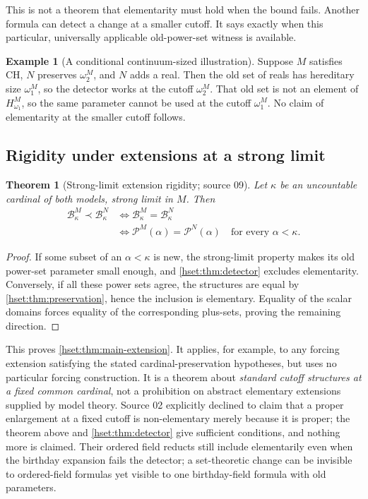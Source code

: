 \documentclass[11pt,letterpaper]{article}
\newtheorem{theorem}{Theorem}[section]
\theoremstyle{definition}
\newtheorem{example}[example]{Example}\aliascntresetthe{example}
\theoremstyle{remark}
\newcommand{\B}{\mathcal B}
\newcommand{\Pow}{\mathcal P}
\begin{document}
This is not a theorem that elementarity must hold when the bound fails.
Another formula can detect a change at a smaller cutoff. It says exactly
when this particular, universally applicable old-power-set witness is
available.

\begin{example}[A conditional continuum-sized illustration]
Suppose $M$ satisfies CH, $N$ preserves $\omega_2^M$, and $N$ adds a real.
Then the old set of reals has hereditary size $\omega_1^M$, so the detector
works at the cutoff $\omega_2^M$. That old set is not an element of
$H_{\omega_1}^M$, so the same parameter cannot be used at the cutoff
$\omega_1^M$. No claim of elementarity at the smaller cutoff follows.
\end{example}

\subsection{Rigidity under extensions at a strong limit}

\begin{theorem}[Strong-limit extension rigidity; source 09]
\label{hset:thm:extension-rigidity}
Let $\kappa$ be an uncountable cardinal of both models, strong limit in $M$.
Then
\begin{align*}
 \B_\kappa^M\prec\B_\kappa^N
 &\iff \B_\kappa^M=\B_\kappa^N\\
 &\iff \Pow^M(\alpha)=\Pow^N(\alpha)
                 \quad\text{for every }\alpha<\kappa.
\end{align*}
\end{theorem}
\begin{proof}
If some subset of an $\alpha<\kappa$ is new, the strong-limit property
makes its old power-set parameter small enough, and \cref{hset:thm:detector}
excludes elementarity. Conversely, if all these power sets agree, the
structures are equal by \cref{hset:thm:preservation}, hence the inclusion is
elementary. Equality of the scalar domains forces equality of the
corresponding plus-sets, proving the remaining direction.
\end{proof}

This proves \cref{hset:thm:main-extension}. It applies, for example, to any
forcing extension satisfying the stated cardinal-preservation hypotheses,
but uses no particular forcing construction. It is a theorem about
\emph{standard cutoff structures at a fixed common cardinal}, not a
prohibition on abstract elementary extensions supplied by model theory.
Source 02 explicitly declined to claim that a proper enlargement at a fixed
cutoff is non-elementary merely because it is proper; the theorem above and
\cref{hset:thm:detector} give sufficient conditions, and nothing more is
claimed. Their ordered field reducts still include elementarily even when the
birthday expansion fails the detector; a set-theoretic change can be invisible
to ordered-field formulas yet visible to one birthday-field formula with old
parameters.
\end{document}
